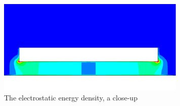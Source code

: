\begin{figure}[h]
\centering
\includegraphics[width=9cm, viewport=0 20 1024 480,clip]{energy}
\caption{The electrostatic energy density, a close-up}\label{fg:es_energy}
\end{figure} 




